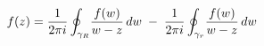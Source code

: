 \documentclass[preview]{standalone}
\begin{document}
\begin{align*}
\special{dvisvgm:raw <g id='unique000'>}f(z) = \frac{1}{2\pi i}\oint_{\gamma_R}\!\frac{f(w)}{w-z}\,dw\; - \;\frac{1}{2\pi i}\oint_{\gamma_r}\!\frac{f(w)}{w-z}\,dw\special{dvisvgm:raw </g>}
\end{align*}
\end{document}
